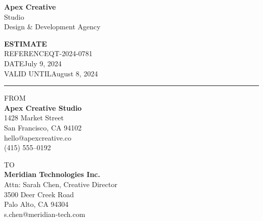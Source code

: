 \documentclass[a4paper,11pt]{article}
\newcommand{\accentrule}{\textcolor{accent}{\rule{\linewidth}{0.5pt}}}
\newcommand{\infolabel}[1]{\textcolor{midgray}{\footnotesize\MakeUppercase{#1}}}
\newcommand{\infovalue}[1]{\textcolor{dark}{#1}}
\begin{document}

\vspace*{7mm}

\begin{minipage}[t]{0.55\linewidth}
  {\fontsize{28}{34}\selectfont\bfseries\color{accent}Apex Creative}\\[1pt]
  {\Large\color{dark}Studio}\\[8pt]
  {\color{midgray}\small Design \& Development Agency}
\end{minipage}%
\hfill
\begin{minipage}[t]{0.40\linewidth}
  \raggedleft
  {\color{accent}\large\bfseries\MakeUppercase{Estimate}}\\[6pt]
  \infolabel{Reference}\hspace{6pt}\infovalue{QT-2024-0781}\\[3pt]
  \infolabel{Date}\hspace{6pt}\infovalue{July 9, 2024}\\[3pt]
  \infolabel{Valid until}\hspace{6pt}\infovalue{August 8, 2024}
\end{minipage}

\vspace{6mm}
\accentrule
\vspace{8mm}

\begin{minipage}[t]{0.50\linewidth}
  \infolabel{From}\\[4pt]
  {\bfseries\color{dark}Apex Creative Studio}\\[2pt]
  {\small\color{midgray}%
   1428 Market Street\\
   San Francisco, CA 94102}\\[6pt]
  {\small\color{midgray}\faEnvelope\enspace hello@apexcreative.co}\\[2pt]
  {\small\color{midgray}\faPhone\enspace (415) 555--0192}
\end{minipage}%
\hfill
\begin{minipage}[t]{0.46\linewidth}
  \infolabel{To}\\[4pt]
  {\bfseries\color{dark}Meridian Technologies Inc.}\\[2pt]
  {\small\color{midgray}%
   Attn: Sarah Chen, Creative Director\\
   3500 Deer Creek Road\\
   Palo Alto, CA 94304}\\[6pt]
  {\small\color{midgray}\faEnvelope\enspace s.chen@meridian-tech.com}
\end{minipage}
\end{document}
